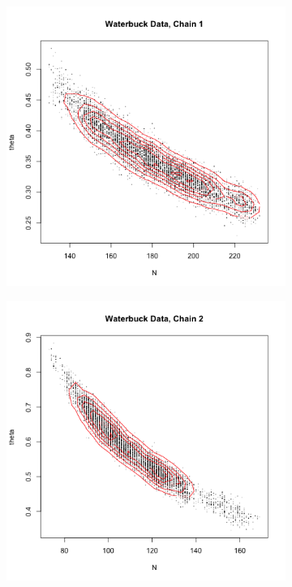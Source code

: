 \documentclass[10pt,psamsfonts]{amsart}
\theoremstyle{definition}
\theoremstyle{remark}
\numberwithin{equation}{section}
\begin{document}
\begin{figure}
	\begin{subfigure}[b]{0.3\textwidth}
		\includegraphics[width=\textwidth]{wonlee_mcmc_waterbuck_1.png}
	\end{subfigure}
	\begin{subfigure}[b]{0.3\textwidth}
		\includegraphics[width=\textwidth]{wonlee_mcmc_waterbuck_2.png}

\end{subfigure}
\end{figure}
\end{document}

